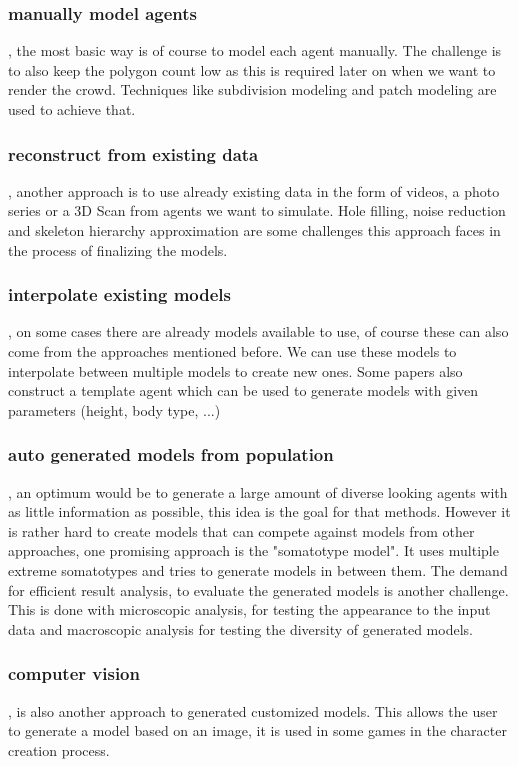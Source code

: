 \documentclass[sigconf]{acmart}
\begin{document}
\subsubsection{manually model agents}, the most basic way is of course to model each agent manually. The challenge is to also keep the polygon count low as this is required later on when we want to render the crowd. Techniques like subdivision modeling and patch modeling are used to achieve that.
\subsubsection{reconstruct from existing data}, another approach is to use already existing data in the form of videos, a photo series or a 3D Scan from agents we want to simulate. Hole filling, noise reduction and skeleton hierarchy approximation are some challenges this approach faces in the process of finalizing the models. 
\subsubsection{interpolate existing models}, on some cases there are already models available to use, of course these can also come from the approaches mentioned before. We can use these models to interpolate between multiple models to create new ones. Some papers also construct a template agent which can be used to generate models with given parameters (height, body type, ...)
\subsubsection{auto generated models from population}, an optimum would be to generate a large amount of diverse looking agents with as little information as possible, this idea is the goal for that methods. However it is rather hard to create models that can compete against models from other approaches, one promising approach is the "somatotype model". It uses multiple extreme somatotypes and tries to generate models in between them. The demand for efficient result analysis, to evaluate the generated models is another challenge. This is done with microscopic analysis, for testing the appearance to the input data and macroscopic analysis for testing the diversity of generated models. 
\subsubsection{computer vision}, is also another approach to generated customized models. This allows the user to generate a model based on an image, it is used in some games in the character creation process. 
\end{document}
